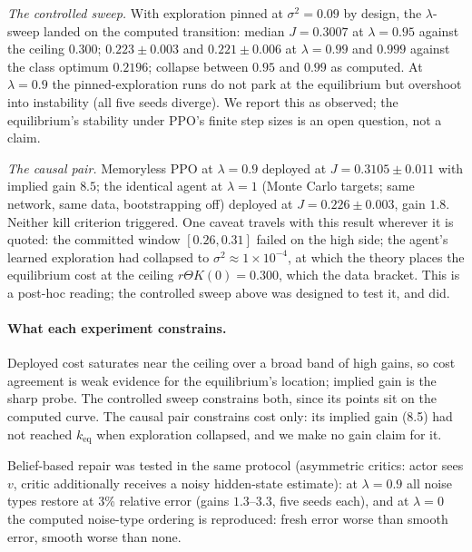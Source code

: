 \documentclass[11pt]{article}
\newcommand{\keq}{k_{\mathrm{eq}}}
\begin{document}
\emph{The controlled sweep.} With exploration pinned at $\sigma^2 = 0.09$ by design, the
$\lambda$-sweep landed on the computed transition: median $J = 0.3007$ at $\lambda = 0.95$
against the ceiling $0.300$; $0.223 \pm 0.003$ and $0.221 \pm 0.006$ at $\lambda = 0.99$ and
$0.999$ against the class optimum $0.2196$; collapse between $0.95$ and $0.99$ as computed.
At $\lambda = 0.9$ the pinned-exploration runs do not park at the equilibrium but overshoot
into instability (all five seeds diverge). We report this as observed; the equilibrium's
stability under PPO's finite step sizes is an open question, not a claim.

\emph{The causal pair.} Memoryless PPO at $\lambda = 0.9$ deployed at
$J = 0.3105 \pm 0.011$ with implied gain $8.5$; the identical agent at $\lambda = 1$ (Monte
Carlo targets; same network, same data, bootstrapping off) deployed at $J = 0.226 \pm 0.003$,
gain $1.8$. Neither kill criterion triggered. One caveat travels with this result wherever it
is quoted: the committed window $[0.26, 0.31]$ failed on the high side; the agent's learned
exploration had collapsed to $\sigma^2 \approx 1\times10^{-4}$, at which the theory places the
equilibrium cost at the ceiling $r\Theta K(0) = 0.300$, which the data bracket. This is a
post-hoc reading; the controlled sweep above was designed to test it, and did.

\paragraph{What each experiment constrains.} Deployed cost saturates near the ceiling over a
broad band of high gains, so cost agreement is weak evidence for the equilibrium's location;
implied gain is the sharp probe. The controlled sweep constrains both, since its points sit on
the computed curve. The causal pair constrains cost only: its implied gain (8.5) had not
reached $\keq$ when exploration collapsed, and we make no gain claim for it.

Belief-based repair was tested in the same protocol (asymmetric critics: actor sees $v$,
critic additionally receives a noisy hidden-state estimate): at $\lambda = 0.9$ all noise
types restore at 3\% relative error (gains $1.3$--$3.3$, five seeds each), and at
$\lambda = 0$ the computed noise-type ordering is reproduced: fresh error worse than smooth
error, smooth worse than none.
\end{document}
